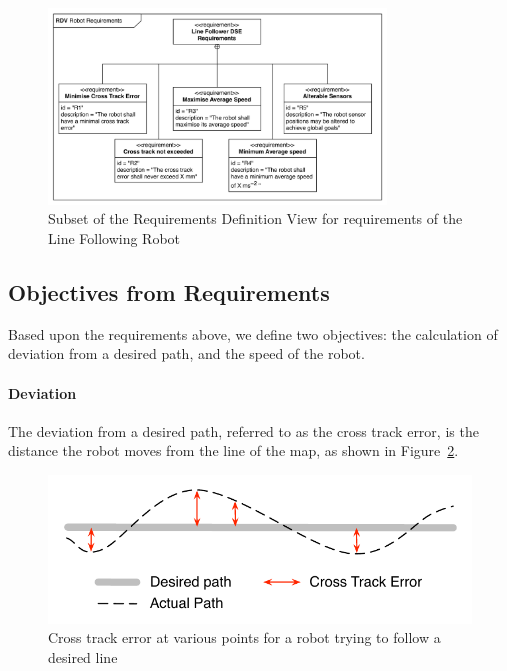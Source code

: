 \begin{figure}[htbp]
	\centering
	\includegraphics[width=0.8\textwidth]{figures/Robot_RDV}
\caption{Subset of the Requirements Definition View for requirements of the Line Following Robot}\label{fig:line_rdv}
\end{figure}



\subsection{Objectives from Requirements}

Based upon the requirements above, we define two objectives: the calculation of deviation from a desired path, and the speed of the robot.

\paragraph{Deviation}

The deviation from a desired path, referred to as the cross track error, is the distance the robot moves from the line of the map, as shown in Figure~\ref{fig:crossTrackError}.

\begin{figure}[htbp]
	\centering
	\includegraphics[scale=0.8]{figures/crossTrackError}
\caption{Cross track error at various points for a robot trying to follow a desired line}\label{fig:crossTrackError}
\end{figure}

